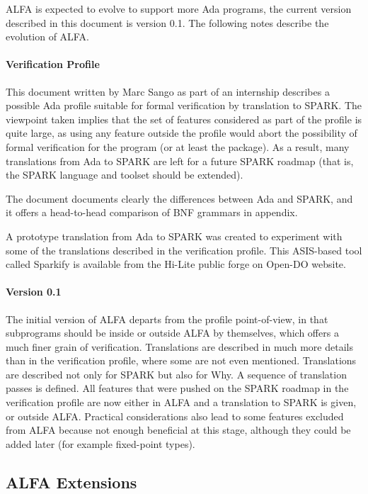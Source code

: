 \documentclass{article}
\newcommand{\version}{0.1}
\newcounter{example}
\begin{document}
ALFA is expected to evolve to support more Ada programs, the current version
described in this document is version \version. The following notes describe
the evolution of ALFA.

\paragraph{Verification Profile} 

This document written by Marc Sango as part of an internship describes a
possible Ada profile suitable for formal verification by translation to
SPARK. The viewpoint taken implies that the set of features considered as part
of the profile is quite large, as using any feature outside the profile would
abort the possibility of formal verification for the program (or at least the
package). As a result, many translations from Ada to SPARK are left for a
future SPARK roadmap (that is, the SPARK language and toolset should be
extended).

The document documents clearly the differences between Ada and SPARK, and it
offers a head-to-head comparison of BNF grammars in appendix.

A prototype translation from Ada to SPARK was created to experiment with some
of the translations described in the verification profile. This ASIS-based tool
called Sparkify is available from the Hi-Lite public forge on Open-DO website.

\paragraph{Version \version}

The initial version of ALFA departs from the profile point-of-view, in that
subprograms should be inside or outside ALFA by themselves, which offers a much
finer grain of verification. Translations are described in much more details
than in the verification profile, where some are not even
mentioned. Translations are described not only for SPARK but also for Why. A
sequence of translation passes is defined. All features that were pushed on the
SPARK roadmap in the verification profile are now either in ALFA and a
translation to SPARK is given, or outside ALFA. Practical considerations also
lead to some features excluded from ALFA because not enough beneficial at this
stage, although they could be added later (for example fixed-point types).

\subsection{ALFA Extensions}
\end{document}
